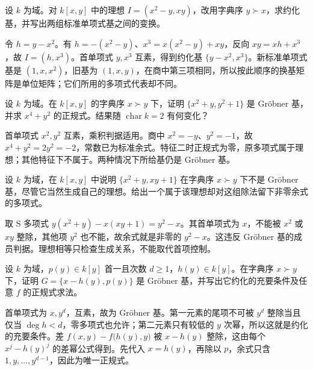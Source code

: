 \begin{exercise}\label{b3:ex:08-order-change-nilpotent}
	设 \(k\) 为域。对 \(k[x,y]\) 中的理想 \(I=(x^2-y,xy)\)，改用字典序 \(y\succ x\)，求约化基，并写出两组标准单项式基之间的变换。
\end{exercise}
\begin{solution}
	令 \(h=y-x^2\)。有 \(h=-(x^2-y)\)、\(x^3=x(x^2-y)+xy\)，反向 \(xy=xh+x^3\)，故 \(I=(h,x^3)\)。首单项式 \(y,x^3\) 互素，得到约化基 \(\{y-x^2,x^3\}\)。新标准单项式基是 \((1,x,x^2)\)，旧基为 \((1,x,y)\)，在商中第三项相同，所以按此顺序的换基矩阵是单位矩阵；它们所用的多项式代表却不同。
\end{solution}

\begin{exercise}\label{b3:ex:08-product-criterion-use}
	设 \(k\) 为域。在 \(k[x,y]\) 的字典序 \(x\succ y\) 下，证明 \(\{x^2+y,y^2+1\}\) 是 Gröbner 基，并求 \(x^4+y^2\) 的正规式。结果随 \(\operatorname{char}k=2\) 有何变化？
\end{exercise}
\begin{solution}
	首单项式 \(x^2,y^2\) 互素，乘积判据适用。商中 \(x^2=-y\)、\(y^2=-1\)，故 \(x^4+y^2=2y^2=-2\)，常数已为标准余式。特征二时正规式为零，原多项式属于理想；其他特征下不属于。两种情况下所给基仍是 Gröbner 基。
\end{solution}

\begin{exercise}\label{b3:ex:08-ideal-equality-insufficient}
	设 \(k\) 为域，在 \(k[x,y]\) 中说明 \(\{x^2+y,xy+1\}\) 在字典序 \(x\succ y\) 下不是 Gröbner 基，尽管它当然生成自己的理想。给出一个属于该理想却对这组除法留下非零余式的多项式。
\end{exercise}
\begin{solution}
	取 S 多项式 \(y(x^2+y)-x(xy+1)=y^2-x\)。其首单项式为 \(x\)，不能被 \(x^2\) 或 \(xy\) 整除，其他项 \(y^2\) 也不能，故余式就是非零的 \(y^2-x\)。这违反 Gröbner 基的成员判据。理想相等只检查生成关系，不能取代首项控制。
\end{solution}

\begin{exercise}\label{b3:ex:08-triangular-normal}
	设 \(k\) 为域，\(p(y)\in k[y]\) 首一且次数 \(d\ge1\)，\(h(y)\in k[y]\)。在字典序 \(x\succ y\) 下，证明 \(G=\bigl\{x-h(y),p(y)\bigr\}\) 是 Gröbner 基，并写出它约化的充要条件及任意 \(f\) 的正规式求法。
\end{exercise}
\begin{solution}
	首单项式为 \(x,y^d\)，互素，故为 Gröbner 基。第一元素的尾项不可被 \(y^d\) 整除当且仅当 \(\deg h<d\)，零多项式也允许；第二元素只有较低的 \(y\) 次幂，所以这就是约化的充要条件。差 \(f(x,y)-f\bigl(h(y),y\bigr)\) 被 \(x-h(y)\) 整除，这由每个 \(x^j-h(y)^j\) 的差幂公式得到。先代入 \(x=h(y)\)，再除以 \(p\)，余式只含 \(1,y,\ldots,y^{d-1}\)，因此为唯一正规式。
\end{solution}

